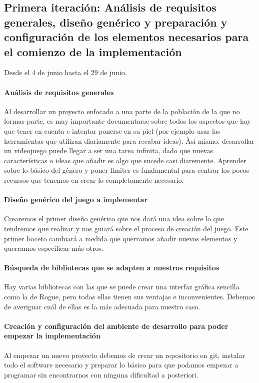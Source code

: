 \subsection{Primera iteración: Análisis de requisitos generales, diseño genérico y preparación y configuración de los elementos necesarios para el comienzo de la implementación}

Desde el 4 de junio hasta el 29 de junio.

\paragraph{Análisis de requisitos generales} Al desarrollar un proyecto enfocado a una parte de la población de la que no formas parte, es muy importante documentarse sobre todos los aspectos que hay que tener en cuenta e intentar ponerse en su piel (por ejemplo usar las herramientas que utilizan diariamente para recabar ideas).
Àsí mismo, desarrollar un videojuego puede llegar a ser una tarea infinita, dado que nuevas características o ideas que añadir es algo que sucede casi diaremente. Aprender sobre lo básico del género y poner límites es fundamental para centrar los pocos recursos que tenemos en crear lo completamente necesario.

\paragraph{Diseño genérico del juego a implementar} Crearemos el primer diseño genérico que nos dará una idea sobre lo que tendremos que realizar y nos guiará sobre el proceso de creación del juego. Este primer boceto cambiará a medida que querramos añadir nuevos elementos y querramos especificar más otros.

\paragraph{Búsqueda de bibliotecas que se adapten a nuestros requisitos} Hay varias bibliotecas con las que se puede crear una interfaz gráfica sencilla como la de Rogue, pero todas ellas tienen sus ventajas e inconvenientes. Debemos de averiguar cuál de ellas es la más adecuada para nuestro caso.

\paragraph{Creación y configuración del ambiente de desarrollo para poder empezar la implementación} Al empezar un nuevo proyecto debemos de crear un repositorio en git, instalar todo el software necesario y preparar lo básico para que podamos empezar a programar sin encontrarnos con ninguna dificultad a posteriori.

